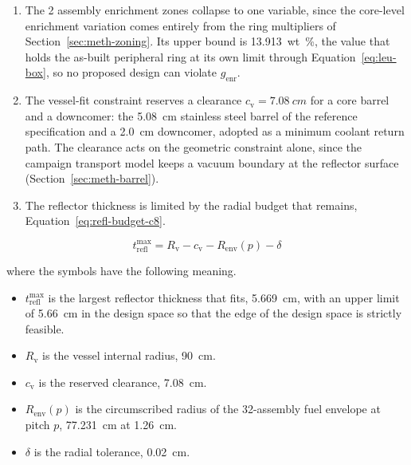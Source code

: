 \begin{enumerate}
  \item The 2 assembly enrichment zones collapse to one variable,
        since the core-level enrichment variation comes entirely from
        the ring multipliers of Section~\ref{sec:meth-zoning}. Its
        upper bound is \SI{13.913}{wt\%}, the value that holds the
        as-built peripheral ring at its own limit through
        Equation~\eqref{eq:leu-box}, so no proposed design can violate
        $g_\mathrm{enr}$.

  \item The vessel-fit constraint reserves a clearance
        $c_\mathrm{v} = \SI{7.08}{cm}$ for a core barrel and a
        downcomer: the \SI{5.08}{cm} stainless steel barrel of the
        reference specification and a \SI{2.0}{cm} downcomer, adopted
        as a minimum coolant return path. The clearance acts on the
        geometric constraint alone, since the campaign transport model
        keeps a vacuum boundary at the reflector surface
        (Section~\ref{sec:meth-barrel}).

  \item The reflector thickness is limited by the radial budget that
        remains, Equation~\eqref{eq:refl-budget-c8}.
\end{enumerate}

\begin{equation}
t_\mathrm{refl}^{\max} = R_\mathrm{v} - c_\mathrm{v} - R_\mathrm{env}(p) - \delta
\label{eq:refl-budget-c8}
\end{equation}

\noindent where the symbols have the following meaning.

\begin{itemize}
  \item $t_\mathrm{refl}^{\max}$ is the largest reflector thickness that
        fits, \SI{5.669}{cm}, with an upper limit of \SI{5.66}{cm} in the design space so that the edge of the design space is strictly feasible.

  \item $R_\mathrm{v}$ is the vessel internal radius, \SI{90}{cm}.

  \item $c_\mathrm{v}$ is the reserved clearance, \SI{7.08}{cm}.

  \item $R_\mathrm{env}(p)$ is the circumscribed radius of the
        32-assembly fuel envelope at pitch $p$, \SI{77.231}{cm} at
        \SI{1.26}{cm}.

  \item $\delta$ is the radial tolerance, \SI{0.02}{cm}.
\end{itemize}

